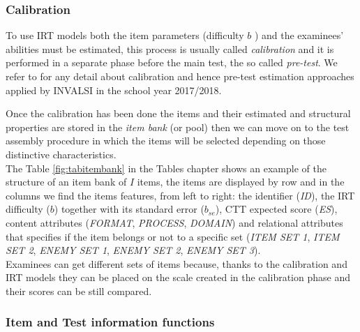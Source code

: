 {\subsubsection{Calibration}
\par{To use IRT models both the item parameters (difficulty $b$%
	) and the examinees' abilities must be estimated, this process is usually called \emph{calibration} and it is performed in a separate phase before the main test, the so called \emph{pre-test}.	We refer to \cite{**here**} for any detail about calibration and hence pre-test estimation approaches applied by INVALSI in the school year 2017/2018.} \\
\par{Once the calibration has been done the items and their estimated and structural properties are stored in the \emph{item bank} (or pool) then we can move on to the test assembly procedure in which the items will be selected depending on those distinctive characteristics.\\
The Table \ref{fig:tabitembank} in the Tables chapter shows an example of the structure of an item bank of $I$ items, the items are displayed by row and in the columns we find the items features, from left to right: the identifier (\textsl{ID}), the IRT difficulty ($b$) together with its standard error ($b_{se}$), CTT expected score (\textsl{ES}), content attributes (\textsl{FORMAT}, \textsl{PROCESS}, \textsl{DOMAIN}) and relational attributes that specifies if the item belongs or not to a specific set (\textsl{ITEM SET 1}, \textsl{ITEM SET 2}, \textsl{ENEMY SET 1}, \textsl{ENEMY SET 2}, \textsl{ENEMY SET 3}).}\\
Examinees can get different sets of items because, thanks to the calibration and IRT models they can be placed on the scale created in the calibration phase and their scores can be still compared.\\
\subsubsection{Item and Test information functions}

}
